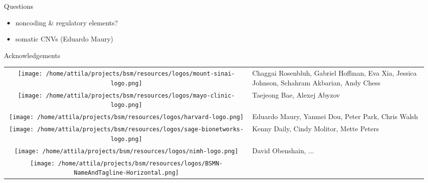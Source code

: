 \documentclass[usenames,dvipsnames]{beamer}
\begin{document}
\begin{frame}{Questions}
\begin{itemize}
\item noncoding \& regulatory elements?
\item somatic CNVs (Eduardo Maury)
\end{itemize}
\end{frame}

\begin{frame}{Acknowledgements}
\footnotesize
\begin{tabular}{cp{3in}}
\parbox[c]{9em}{\texttt{[image: /home/attila/projects/bsm/resources/logos/mount-sinai-logo.png]}}
& Chaggai Rosenbluh, Gabriel Hoffman, Eva Xia, Jessica Johnson, Schahram Akbarian, Andy Chess \\
\noalign{\medskip}
\parbox[c]{9em}{\texttt{[image: /home/attila/projects/bsm/resources/logos/mayo-clinic-logo.png]}} & Taejeong Bae, Alexej Abyzov \\
\noalign{\medskip}
\parbox[c]{9em}{\texttt{[image: /home/attila/projects/bsm/resources/logos/harvard-logo.png]}}
& Eduardo Maury, Yanmei Dou, Peter Park, Chris Walsh \\
\noalign{\medskip}
\parbox[c]{9em}{\texttt{[image: /home/attila/projects/bsm/resources/logos/sage-bionetworks-logo.png]}} & Kenny Daily, Cindy Molitor, Mette Peters \\
\noalign{\medskip}
\parbox[c]{9em}{\texttt{[image: /home/attila/projects/bsm/resources/logos/nimh-logo.png]}}
& David Obenshain, ... \\
\noalign{\medskip}
\parbox[c]{9em}{\texttt{[image: /home/attila/projects/bsm/resources/logos/BSMN-NameAndTagline-Horizontal.png]}}
& \\
\end{tabular}
\end{frame}
\end{document}
